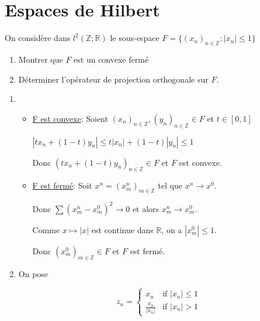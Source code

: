 \documentclass[10pt,a4paper,oneside]{article}
\newenvironment{exercice}[1][Exercice]{\begin{trivlist}
\item[\hskip \labelsep {\bfseries #1}]}{\end{trivlist}}
\newenvironment{solution}[1][Solution]{\begin{trivlist}
\item[\hskip \labelsep {\bfseries #1}]}{\end{trivlist}}
\begin{document}
\section{Espaces de Hilbert}

\begin{exercice}

On considère dans $l^2(\mathbb{Z};\mathbb{R})$ le sous-espace $F = \{ (x_n)_{n \in \mathbb{Z}} : |x_n| \leq 1 \}$

\begin{enumerate}

\item
Montrer que $F$ est un convexe fermé

\item
Déterminer l'opérateur de projection orthogonale sur $F$.

\end{enumerate}

\begin{solution}

\begin{enumerate}

\item

\begin{itemize}
\item
\underline{F est convexe}:
Soient $(x_n)_{n \in \mathbb{Z}}, (y_n)_{n \in \mathbb{Z}} \in F$ et $t \in [0,1]$

$| tx_n + (1 - t)y_n| \leq t |x_n| + (1-t) |y_n| \leq 1$

Donc $(t x_n + (1 - t) y_n )_{n \in \mathbb{Z}} \in F$ et $F$ est convexe.

\item
\underline{F est fermé}:
Soit $x^n = (x^n_m)_{m \in \mathbb{Z}}$ tel que $x^n \rightarrow x^0$.

Donc $\sum (x^n_m - x^0_m)^2 \rightarrow 0$ et alors $x^n_m \rightarrow x^0_m$.

Comme $x \mapsto |x|$ est continue dans $\mathbb{R}$, on a $|x^0_m| \leq 1$.

Donc $(x^0_m)_{m \in \mathbb{Z}} \in F$ et $F$ est fermé.

\end{itemize}

\item
On pose

\[
 z_n =
  \begin{cases}
   x_n & \text{if } |x_n| \leq 1 \\
   \frac{x_n}{|x_n|} & \text{if } |x_n| > 1
  \end{cases}
\]


\end{enumerate}
\end{solution}
\end{exercice}
\end{document}
